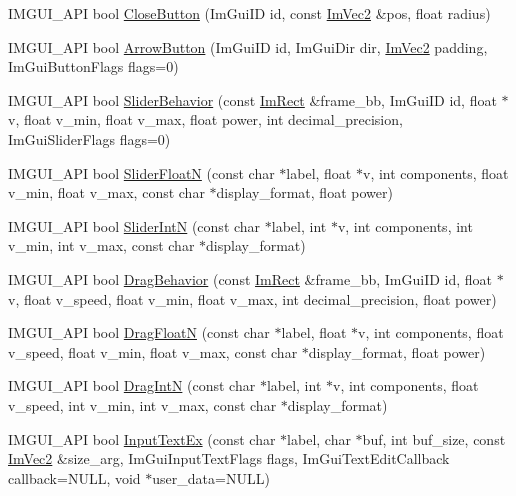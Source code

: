 \begin{DoxyCompactItemize}
\item 
I\+M\+G\+U\+I\+\_\+\+A\+PI bool \hyperlink{namespace_im_gui_a5e8e4df6418dcda3c4c5d15ecdf7d968}{Close\+Button} (Im\+Gui\+ID id, const \hyperlink{struct_im_vec2}{Im\+Vec2} \&pos, float radius)
\item 
I\+M\+G\+U\+I\+\_\+\+A\+PI bool \hyperlink{namespace_im_gui_ac7c2bd67d2bb2d8ee4b583b1576a0bd3}{Arrow\+Button} (Im\+Gui\+ID id, Im\+Gui\+Dir dir, \hyperlink{struct_im_vec2}{Im\+Vec2} padding, Im\+Gui\+Button\+Flags flags=0)
\item 
I\+M\+G\+U\+I\+\_\+\+A\+PI bool \hyperlink{namespace_im_gui_a3d3b2964eeba76dadaa532232c23fc97}{Slider\+Behavior} (const \hyperlink{struct_im_rect}{Im\+Rect} \&frame\+\_\+bb, Im\+Gui\+ID id, float $\ast$v, float v\+\_\+min, float v\+\_\+max, float power, int decimal\+\_\+precision, Im\+Gui\+Slider\+Flags flags=0)
\item 
I\+M\+G\+U\+I\+\_\+\+A\+PI bool \hyperlink{namespace_im_gui_a3ffffbdfe59f18a2321dd1cb39dfb6e1}{Slider\+FloatN} (const char $\ast$label, float $\ast$v, int components, float v\+\_\+min, float v\+\_\+max, const char $\ast$display\+\_\+format, float power)
\item 
I\+M\+G\+U\+I\+\_\+\+A\+PI bool \hyperlink{namespace_im_gui_a13fe35db80c7d1002c98fd5e8ea90239}{Slider\+IntN} (const char $\ast$label, int $\ast$v, int components, int v\+\_\+min, int v\+\_\+max, const char $\ast$display\+\_\+format)
\item 
I\+M\+G\+U\+I\+\_\+\+A\+PI bool \hyperlink{namespace_im_gui_a4fdcba60dbe3762a144051add234ea48}{Drag\+Behavior} (const \hyperlink{struct_im_rect}{Im\+Rect} \&frame\+\_\+bb, Im\+Gui\+ID id, float $\ast$v, float v\+\_\+speed, float v\+\_\+min, float v\+\_\+max, int decimal\+\_\+precision, float power)
\item 
I\+M\+G\+U\+I\+\_\+\+A\+PI bool \hyperlink{namespace_im_gui_a2a2764b6f0b3291ad0df4d99127dd751}{Drag\+FloatN} (const char $\ast$label, float $\ast$v, int components, float v\+\_\+speed, float v\+\_\+min, float v\+\_\+max, const char $\ast$display\+\_\+format, float power)
\item 
I\+M\+G\+U\+I\+\_\+\+A\+PI bool \hyperlink{namespace_im_gui_a2854d672b818938e6e9fb1de6de3dbe7}{Drag\+IntN} (const char $\ast$label, int $\ast$v, int components, float v\+\_\+speed, int v\+\_\+min, int v\+\_\+max, const char $\ast$display\+\_\+format)
\item 
I\+M\+G\+U\+I\+\_\+\+A\+PI bool \hyperlink{namespace_im_gui_a4a62260abe773d4e193db94cdfdc41bf}{Input\+Text\+Ex} (const char $\ast$label, char $\ast$buf, int buf\+\_\+size, const \hyperlink{struct_im_vec2}{Im\+Vec2} \&size\+\_\+arg, Im\+Gui\+Input\+Text\+Flags flags, Im\+Gui\+Text\+Edit\+Callback callback=N\+U\+LL, void $\ast$user\+\_\+data=N\+U\+LL)

\end{DoxyCompactItemize}
